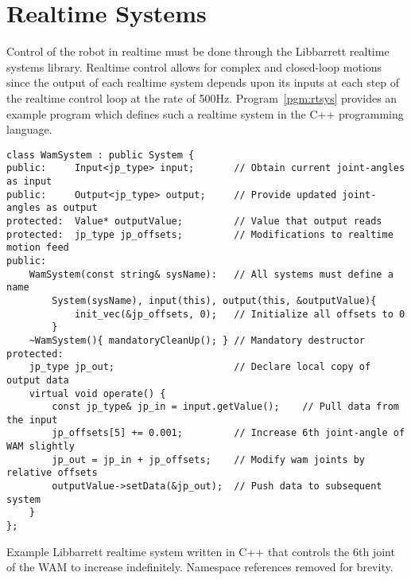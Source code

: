 \section{Realtime Systems}
\label{sec:realtime_eg}
Control of the robot in realtime must be done through the Libbarrett realtime systems library.
Realtime control allows for complex and closed-loop motions since the output of each realtime system depends upon its inputs at each step of the realtime control loop at the rate of 500Hz.
Program~\ref{pgm:rtsys} provides an example program which defines such a realtime system in the C++ programming language.

\begin{Program}[width=0.5\pagewidth]
\center
\begin{verbatim}
class WamSystem : public System {
public:     Input<jp_type> input;       // Obtain current joint-angles as input
public:     Output<jp_type> output;     // Provide updated joint-angles as output
protected:  Value* outputValue;         // Value that output reads
protected:  jp_type jp_offsets;         // Modifications to realtime motion feed
public:
    WamSystem(const string& sysName):   // All systems must define a name
        System(sysName), input(this), output(this, &outputValue){ 
            init_vec(&jp_offsets, 0);   // Initialize all offsets to 0
        }
    ~WamSystem(){ mandatoryCleanUp(); } // Mandatory destructor 
protected:
    jp_type jp_out;                     // Declare local copy of output data
    virtual void operate() {
        const jp_type& jp_in = input.getValue();    // Pull data from the input
        jp_offsets[5] += 0.001;         // Increase 6th joint-angle of WAM slightly
        jp_out = jp_in + jp_offsets;    // Modify wam joints by relative offsets
        outputValue->setData(&jp_out);  // Push data to subsequent system
    }
};
\end{verbatim}
  \caption{Example Libbarrett realtime system written in C++ that controls the 6th joint of the WAM to increase indefinitely. Namespace references removed for brevity.}
  \label{pgm:rtsys}
\end{Program}


